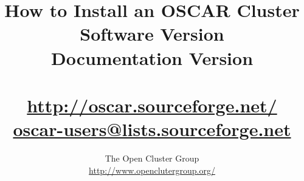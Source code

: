 %
%
%

\title{How to Install an OSCAR Cluster \\
Software Version \oscarversion \\
Documentation Version \docsversion \\
\ \\
\url{http://oscar.sourceforge.net/} \\
\href{mailto:oscar-users@lists.sourceforge.net}{oscar-users@lists.sourceforge.net}}

\author{The Open Cluster Group \\
\url{http://www.openclutergroup.org/}}
\maketitle
